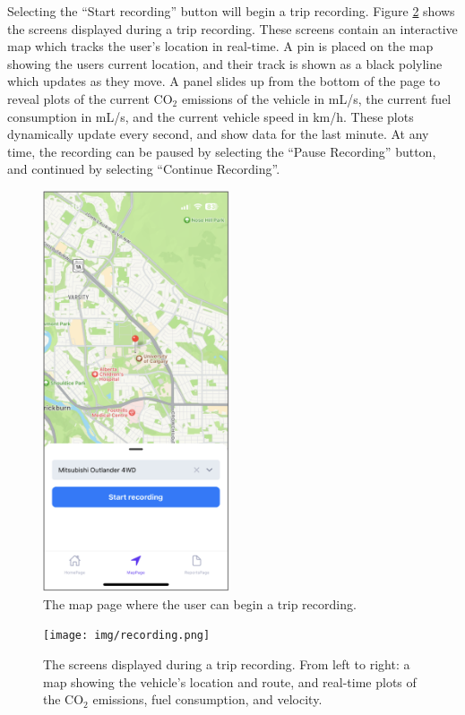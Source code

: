 \documentclass[11pt, oneside]{article}
\begin{document}
Selecting the ``Start recording'' button will begin a trip recording.  Figure \ref*{fig:recording} shows the screens displayed during a trip recording.  These screens contain an interactive map which tracks the user's location in real-time.  A pin is placed on the map showing the users current location, and their track is shown as a black polyline which updates as they move.  A panel slides up from the bottom of the page to reveal plots of the current CO$_2$ emissions of the vehicle in mL/s, the current fuel consumption in mL/s, and the current vehicle speed in km/h.  These plots dynamically update every second, and show data for the last minute.  At any time, the recording can be paused by selecting the ``Pause Recording'' button, and continued by selecting ``Continue Recording''.  
\begin{figure}[!t]
\centerline{\includegraphics[width=5.5cm]{img/mapinit.png}}
\caption{\label{fig:mappage} The map page where the user can begin a trip recording.}
\end{figure}
\begin{figure}[H]
\centerline{\texttt{[image: img/recording.png]}}
\caption{\label{fig:recording} The screens displayed during a trip recording.  From left to right: a map showing the vehicle's location and route, and real-time plots of the CO$_2$ emissions, fuel consumption, and velocity.}
\end{figure}
\end{document}
